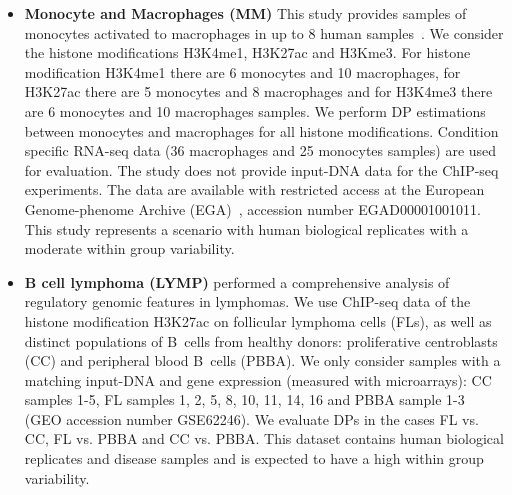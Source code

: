 \begin{itemize}
\item \textbf{Monocyte and Macrophages (MM)}
This study provides samples of monocytes activated to macrophages in up to 8 human samples~\citep{Stunnenberg2014}.
We consider the histone modifications H3K4me1, H3K27ac and H3Kme3.
For histone modification H3K4me1 there are 6 monocytes and 10 macrophages, for H3K27ac there are 5 monocytes and 8 macrophages and for H3K4me3 there are 6 monocytes and 10 macrophages samples.
We perform DP estimations between monocytes and macrophages for all histone modifications.
Condition specific RNA-seq data (36 macrophages and 25 monocytes samples) are used for evaluation.
The study does not provide input-DNA data for the ChIP-seq experiments.
The data are available with restricted access at the European Genome-phenome Archive (EGA)~\citep{Lappalainen2015}, accession number EGAD00001001011.
This study represents a scenario with human biological replicates with a moderate within group variability.

\item \textbf{B cell lymphoma (LYMP)} \cite{Koues2015} performed a comprehensive analysis of regulatory genomic features in lymphomas. 
We use ChIP-seq data of the histone modification H3K27ac on follicular lymphoma cells (FLs), as well as distinct populations of B~cells from healthy donors: proliferative centroblasts (CC) and peripheral blood B~cells (PBBA). 
We only consider samples with a matching input-DNA and gene expression (measured with microarrays): CC samples 1-5, FL samples 1, 2, 5, 8, 10, 11, 14, 16 and PBBA sample 1-3 (GEO accession number GSE62246). 
We evaluate DPs in the cases FL vs. CC, FL vs. PBBA and CC vs. PBBA. 
This dataset contains human biological replicates and disease samples and is expected to have a high within group variability. 

\end{itemize}



